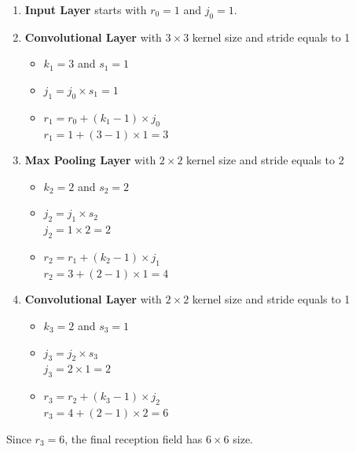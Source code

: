 \documentclass[12pt, a4paper]{article}
\begin{document}
            \begin{enumerate}
                \item \textbf{Input Layer} starts with $r_0 = 1$ and $j_0 = 1$.
                \item \textbf{Convolutional Layer} with $3 \times 3$ kernel size and stride equals to 1
                \begin{itemize}
                    \item $k_1 = 3$ and $s_1 = 1$
                    \item $j_1 = j_0 \times s_1 = 1$
                    \item $r_1 = r_0 + (k_1 - 1) \times j_0$ \\
                    $r_1 = 1 + (3 - 1) \times 1 = 3$
                \end{itemize}

    \pagebreak

                \item \textbf{Max Pooling Layer} with $2 \times 2$ kernel size and stride equals to 2
                \begin{itemize}
                    \item $k_2 = 2$ and $s_2 = 2$
                    \item $j_2 = j_1 \times s_2$ \\
                    $j_2 = 1 \times 2 = 2$
                    \item $r_2 = r_1 + (k_2 - 1) \times j_1$ \\
                    $r_2 = 3 + (2 - 1) \times 1 = 4$
                \end{itemize}
                \item \textbf{Convolutional Layer} with $2 \times 2$ kernel size and stride equals to 1
                \begin{itemize}
                    \item $k_3 = 2$ and $s_3 = 1$
                    \item $j_3 = j_2 \times s_3$ \\
                    $j_3 = 2 \times 1 = 2$
                    \item $r_3 = r_2 + (k_3 - 1) \times j_2$ \\
                    $r_3 = 4 + (2 - 1) \times 2 = 6$
                \end{itemize}
            \end{enumerate}

            \noindent Since $r_3 = 6$, the final reception field has $6 \times 6$ size.
\end{document}
